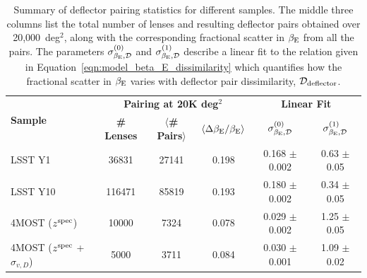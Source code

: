 \documentclass[a4paper,11pt]{article}
\begin{document}
\begin{table}
    \centering

    \caption{Summary of deflector pairing statistics for different samples. The middle three columns list the total number of lenses and resulting deflector pairs obtained over 20,000~deg$^2$, 
along with the corresponding fractional scatter in $\beta_{\rm E}$ from all the pairs. The parameters $\sigma_{\beta_{\rm E},\rm \mathcal{D}}^{(0)}$ and $\sigma_{\beta_{\rm E},\rm \mathcal{D}}^{(1)}$ describe a linear fit to the relation given in Equation~\ref{eqn:model_beta_E_dissimilarity}
which quantifies how the fractional scatter in $\beta_{\rm E}$ varies with deflector pair dissimilarity, $\mathcal{D}_{\rm deflector}$. 
}\vspace{1em}
    \label{tab:slsim_all_samples_pairing_statistics}

\begin{tabular}{l | c c c | c c}
\hline
\multirow{2}{*}{\textbf{Sample}} & \multicolumn{3}{c|}{\textbf{Pairing at 20K deg$^2$}} & \multicolumn{2}{c}{\textbf{Linear Fit}} \\
 & \textbf{\# Lenses} & \textbf{$\langle$\# Pairs$\rangle$} & \textbf{$\langle{\Delta\beta_{\rm E}/\beta_{\rm E}}\rangle$} & \textbf{$\sigma_{\beta_{\rm E},\rm \mathcal{D}}^{(0)}$} & \textbf{$\sigma_{\beta_{\rm E},\rm \mathcal{D}}^{(1)}$} \\
\hline
LSST Y1 & 36831 & 27141 & 0.198 & 0.168 $\pm$ 0.002 & 0.63 $\pm$ 0.05 \\
LSST Y10 & 116471 & 85819 & 0.193 & 0.180 $\pm$ 0.002 & 0.34 $\pm$ 0.05 \\
4MOST ($z^{\rm spec}$) & 10000 & 7324 & 0.078 & 0.029 $\pm$ 0.002 & 1.25 $\pm$ 0.05 \\
4MOST ($z^{\rm spec}$ + $\sigma_{v, D}$) & 5000 & 3711 & 0.084 & 0.030 $\pm$ 0.001 & 1.09 $\pm$ 0.02 \\
\hline
\end{tabular}
\end{table}
\end{document}
